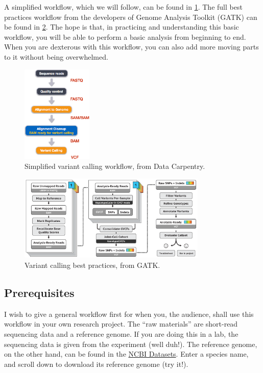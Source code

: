 \documentclass[12pt,letterpaper]{article}
\begin{document}
A simplified workflow, which we will follow, can be found in \cref*{fig:simplified-varcall-workflow}. The full best practices workflow from the developers of Genome Analysis Toolkit (GATK) can be found in \cref*{fig:gatk-varcall-workflow}. The hope is that, in practicing and understanding this basic workflow, you will be able to perform a basic analysis from beginning to end. When you are dexterous with this workflow, you can also add more moving parts to it without being overwhelmed.

\begin{figure}[H]
\centering
\includegraphics[width=0.3\textwidth]{data_carpentry_variant_calling_workflow.png}
\caption{Simplified variant calling workflow, from Data Carpentry.}
\label{fig:simplified-varcall-workflow}
\end{figure}

\begin{figure}[H]
\centering
\includegraphics[width=0.8\textwidth]{gatk_varcall_workflow.png}
\caption{Variant calling best practices, from GATK.}
\label{fig:gatk-varcall-workflow}
\end{figure}

\subsection{Prerequisites}

I wish to give a general workflow first for when you, the audience, shall use this workflow in your own research project. The ``raw materials'' are short-read sequencing data and a reference genome. If you are doing this in a lab, the sequencing data is given from the experiment (well duh!). The reference genome, on the other hand, can be found in the \href{https://www.ncbi.nlm.nih.gov/datasets/}{NCBI Datasets}. Enter a species name, and scroll down to download its reference genome (try it!).
\end{document}
